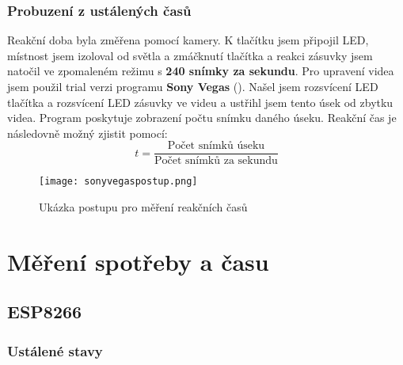 \documentclass[a4paper, 12pt]{report}
\begin{document}
				\subsection{Probuzení z ustálených časů}
					Reakční doba byla změřena pomocí kamery. K tlačítku jsem připojil LED, místnost jsem izoloval od světla a zmáčknutí tlačítka a reakci zásuvky jsem natočil ve zpomaleném režimu s {\bf 240 snímky za sekundu}. Pro upravení videa jsem použil trial verzi programu {\bf Sony Vegas} (). Našel jsem rozsvícení LED tlačítka a rozsvícení LED zásuvky ve videu a ustřihl jsem tento úsek od zbytku videa. Program poskytuje zobrazení počtu snímku daného úseku. Reakční čas je následovně možný zjistit pomocí:
					$$ t = \frac{\textrm{Počet snímků úseku}}{\textrm{Počet snímků za sekundu}}$$
					\begin{figure}[h]
						\centering
						\texttt{[image: sonyvegaspostup.png]}
						\caption{Ukázka postupu pro měření reakčních časů}
						\label{sonyvegaspostup}
					\end{figure}











	\chapter{Měření spotřeby a času}
		\section{ESP8266}
			\subsection{Ustálené stavy}
\end{document}
